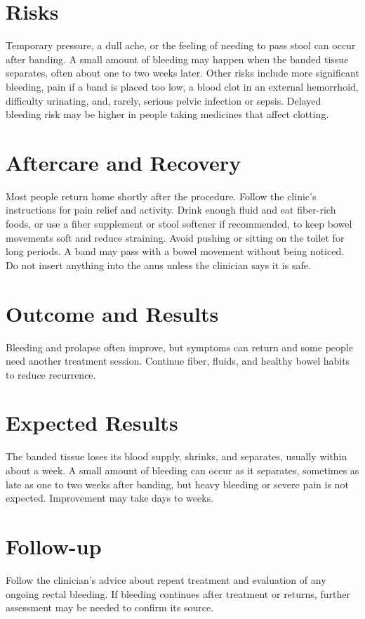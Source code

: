 \section*{Risks}
Temporary pressure, a dull ache, or the feeling of needing to pass stool can occur after banding. A small amount of bleeding may happen when the banded tissue separates, often about one to two weeks later. Other risks include more significant bleeding, pain if a band is placed too low, a blood clot in an external hemorrhoid, difficulty urinating, and, rarely, serious pelvic infection or sepsis. Delayed bleeding risk may be higher in people taking medicines that affect clotting.

\section*{Aftercare and Recovery}
Most people return home shortly after the procedure. Follow the clinic's instructions for pain relief and activity. Drink enough fluid and eat fiber-rich foods, or use a fiber supplement or stool softener if recommended, to keep bowel movements soft and reduce straining. Avoid pushing or sitting on the toilet for long periods. A band may pass with a bowel movement without being noticed. Do not insert anything into the anus unless the clinician says it is safe.

\section*{Outcome and Results}
Bleeding and prolapse often improve, but symptoms can return and some people need another treatment session. Continue fiber, fluids, and healthy bowel habits to reduce recurrence.

\section*{Expected Results}
The banded tissue loses its blood supply, shrinks, and separates, usually within about a week. A small amount of bleeding can occur as it separates, sometimes as late as one to two weeks after banding, but heavy bleeding or severe pain is not expected. Improvement may take days to weeks.

\section*{Follow-up}
Follow the clinician's advice about repeat treatment and evaluation of any ongoing rectal bleeding. If bleeding continues after treatment or returns, further assessment may be needed to confirm its source.

